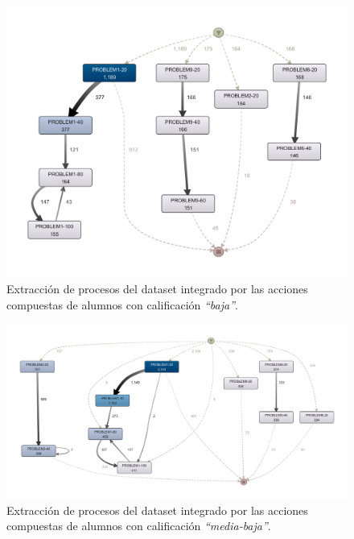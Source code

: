 \begin{figure}[H]
    \centering
    \includegraphics[width=1.25\textwidth]{imagenes/WorstGrades.png}
    \caption{Extracción de procesos del dataset integrado por las acciones compuestas de alumnos con calificación \emph{``baja''}.}
    \label{fig:worstGrades}
\end{figure}

\begin{figure}[H]
    \centering
    \includegraphics[width=1.25\textwidth]{imagenes/MidLowGrades.png}
    \caption{Extracción de procesos del dataset integrado por las acciones compuestas de alumnos con calificación \emph{``media-baja''}.}
    \label{fig:midLowGrades}
\end{figure}

